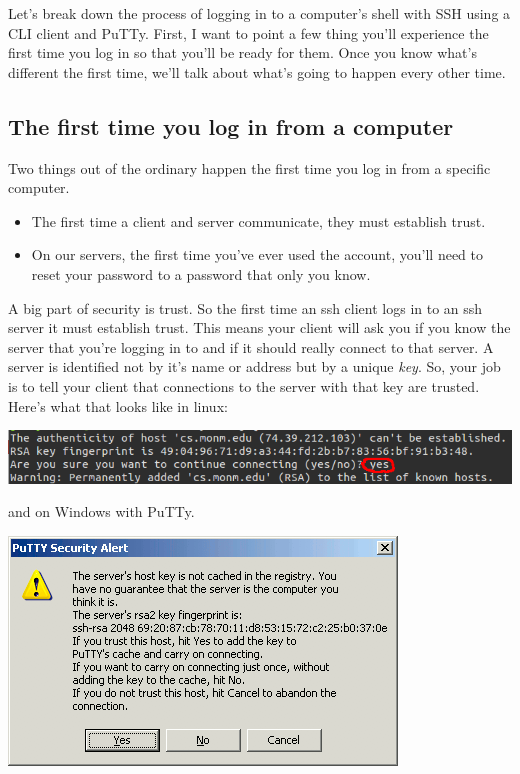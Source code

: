 \documentclass[]{tufte-handout}
\begin{document}
Let's break down the process of logging in to a computer's shell with SSH using a CLI client and PuTTy.  First, I want to point a few thing you'll experience the first time you log in so that you'll be ready for them. Once you know what's different the first time, we'll talk about what's going to happen every other time.

\subsection{The first time you log in from a computer}

Two things out of the ordinary happen the first time you log in from a specific computer.  
\begin{itemize}
\item The first time a client and server communicate, they must establish trust.
\item On our servers, the first time you've ever used the account, you'll need to reset your password to a password that only you know. 
\end{itemize}

A big part of security is trust. So the first time an ssh client logs in to an ssh server it must establish trust.  This means your client will ask you if you know the server that you're logging in to and if it should really connect to that server. A server is identified not by it's name or address but by a unique \textit{key}. So, your job is to tell your client that connections to the server with that key are trusted.  Here's what that looks like in linux:

\vspace{.1in}
\begin{center}
\includegraphics[scale=.5]{linux-knownhost.png}
\end{center}
\vspace{.1in}


and on Windows with PuTTy.

\vspace{.1in}
\begin{center}
\includegraphics[scale=.5]{putty-host-key-warning.png}
\end{center}
\vspace{.1in}
\end{document}
